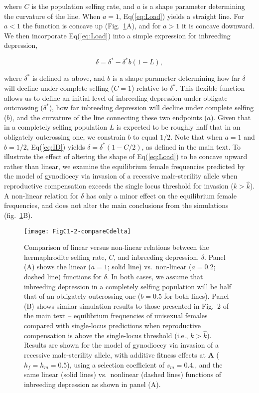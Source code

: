 \documentclass{article}
\begin{document}
\noindent where $C$ is the population selfing rate, and $a$ is a shape parameter determining the curvature of the line. When $a = 1$, Eq(\ref{eq:Load}) yields a straight line. For $a < 1$ the function is concave up (Fig.~\ref{fig:Cdelta}A), and for $a > 1$ it is concave downward. We then incorporate Eq(\ref{eq:Load}) into a simple expression for inbreeding depression,

\begin{equation}\label{eq:ID}
    \delta = \delta^{\ast} - \delta^{\ast} b (1 - L),
\end{equation}

\noindent where $\delta^\ast$ is defined as above, and $b$ is a shape parameter determining how far $\delta$ will decline under complete selfing ($C = 1$) relative to $\delta^{\ast}$. This flexible function allows us to define an initial level of inbreeding depression under obligate outcrossing ($\delta^\ast$), how far inbreeding depression will decline under complete selfing ($b$), and the curvature of the line connecting these two endpoints ($a$). Given that in a completely selfing population $L$ is expected to be roughly half that in an obligately outcrossing one, we constrain $b$ to equal $1/2$. Note that when $a=1$ and $b=1/2$, Eq(\ref{eq:ID}) yields $\delta = \delta^\ast(1 - C/2)$, as defined in the main text. To illustrate the effect of altering the shape of Eq(\ref{eq:Load}) to be concave upward rather than linear, we examine the equilibrium female frequencies predicted by the model of gynodioecy via invasion of a recessive male-sterility allele when reproductive compensation exceeds the single locus threshold for invasion ($k > \hat{k}$). A non-linear relation for $\delta$ has only a minor effect on the equilibrium female frequencies, and does not alter the main conclusions from the simulations (fig.~\ref{fig:Cdelta}B).

\begin{figure}[ht!]
\centering
\texttt{[image: FigC1-2-compareCdelta]}
\caption{Comparison of linear versus non-linear relations between the hermaphrodite selfing rate, $C$, and inbreeding depression, $\delta$. Panel (A) shows the linear ($a=1$; solid line) vs.~non-linear ($a=0.2$; dashed line) functions for $\delta$. In both cases, we assume that inbreeding depression in a completely selfing population will be half that of an obligately outcrossing one ($b=0.5$ for both lines). Panel (B) shows similar simulation results to those presented in Fig.~2 of the main text -- equilibrium frequencies of unisexual females compared with single-locus predictions when reproductive compensation is above the single-locus threshold (i.e., $k > \hat{k}$). Results are shown for the model of gynodioecy via invasion of a recessive male-sterility allele, with additive fitness effects at $\mathbf{A}$ ($h_f = h_m = 0.5$), using a selection coefficient of $s_m = 0.4$., and the same linear (solid lines) vs.~nonlinear (dashed lines) functions of inbreeding depression as shown in panel (A).}
\label{fig:Cdelta}
\end{figure}



\clearpage


\end{document}
